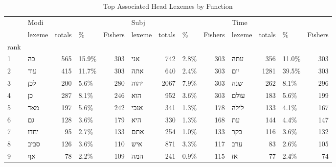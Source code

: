 \begin{table}[htbp!]
\centering
\caption{Top Associated Head Lexemes by Function}
\label{table:mst_lexs}
\begin{adjustbox}{width=1\textwidth}
\begin{tabular}{llrlrlrlrlrlr}
\toprule
{} & \multicolumn{4}{l}{Modi} & \multicolumn{4}{l}{Subj} & \multicolumn{4}{l}{Time} \\
{} &             lexeme & totals &      \% & Fishers &              lexeme & totals &     \% & Fishers &              lexeme & totals &      \% & Fishers \\
rank &                    &        &        &         &                     &        &       &         &                     &        &        &         \\
\midrule
1    &    \texthebrew{כה} &    565 &  15.9\% &     303 &    \texthebrew{אני} &    742 &  2.8\% &     303 &    \texthebrew{עתה} &    356 &  11.0\% &     303 \\
2    &   \texthebrew{עוד} &    415 &  11.7\% &     303 &    \texthebrew{אתה} &    640 &  2.4\% &     303 &    \texthebrew{יום} &   1281 &  39.5\% &     303 \\
3    &   \texthebrew{לכן} &    200 &   5.6\% &     280 &   \texthebrew{יהוה} &   2067 &  7.9\% &     303 &    \texthebrew{שנה} &    262 &   8.1\% &     296 \\
4    &    \texthebrew{כן} &    287 &   8.1\% &     246 &    \texthebrew{הוא} &    952 &  3.6\% &     303 &   \texthebrew{עולם} &    183 &   5.6\% &     199 \\
5    &   \texthebrew{מאד} &    197 &   5.6\% &     242 &   \texthebrew{אנכי} &    341 &  1.3\% &     178 &   \texthebrew{לילה} &    133 &   4.1\% &     167 \\
6    &    \texthebrew{גם} &    128 &   3.6\% &     179 &    \texthebrew{היא} &    330 &  1.3\% &     168 &     \texthebrew{עת} &    144 &   4.4\% &     147 \\
7    &  \texthebrew{יחדו} &     95 &   2.7\% &     133 &    \texthebrew{אתם} &    254 &  1.0\% &     133 &    \texthebrew{בקר} &    116 &   3.6\% &     132 \\
8    &  \texthebrew{סביב} &    126 &   3.6\% &     110 &    \texthebrew{איש} &    871 &  3.3\% &     117 &    \texthebrew{ערב} &     83 &   2.6\% &     105 \\
9    &    \texthebrew{אף} &     78 &   2.2\% &     109 &    \texthebrew{המה} &    241 &  0.9\% &     115 &     \texthebrew{אז} &     77 &   2.4\% &      74 \\

\end{tabular}
\end{adjustbox}
\end{table}
